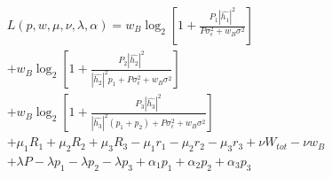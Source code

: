 \documentclass[preview]{standalone}
\begin{document}
\begin{align*}
L(p, w, \mu, \nu, \lambda, \alpha) = w_B \log_2 \left[1 + \frac{P_1 \left|\hat{h_1}\right|^2}{P \sigma_{\epsilon}^2 + w_B \sigma^2}\right] \\ + w_B \log_2 \left[1 + \frac{P_2 \left|\hat{h_2}\right|^2}{\left|\hat{h_2}\right|^2 p_1 + P \sigma_{\epsilon}^2 + w_B \sigma^2}\right] \\ + w_B \log_2 \left[1 + \frac{P_3 \left|\hat{h_3}\right|^2}{\left|\hat{h_3}\right|^2 (p_1 + p_2) + P \sigma_{\epsilon}^2 + w_B \sigma^2}\right] \\ + \mu_1 R_1 + \mu_2 R_2 + \mu_3 R_3 - \mu_1 r_1 - \mu_2 r_2 - \mu_3 r_3 + \nu W_{tot} - \nu w_B \\ + \lambda P - \lambda p_1 - \lambda p_2 - \lambda p_3 + \alpha_1 p_1 + \alpha_2 p_2 + \alpha_3 p_3
\end{align*}
\end{document}
